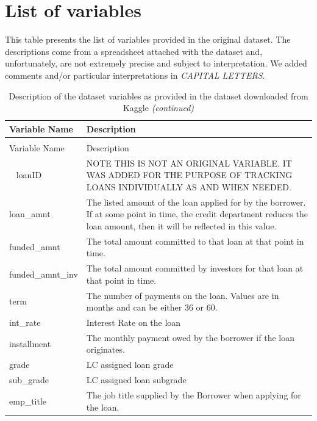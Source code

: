 \documentclass[11pt,]{report}
\begin{document}
\hypertarget{list-of-variables}{%
\section{List of variables}\label{list-of-variables}}

This table presents the list of variables provided in the original dataset. The descriptions come from a spreadsheet attached with the dataset and, unfortunately, are not extremely precise and subject to interpretation. We added comments and/or particular interpretations in \emph{CAPITAL LETTERS}.

\begin{longtable}[t]{>{\raggedright\arraybackslash}p{7cm}>{\raggedright\arraybackslash}p{7cm}}
\caption{\label{tab:variable-description}Description of the dataset variables as provided in the dataset downloaded from Kaggle}\\
\toprule
Variable Name & Description\\
\midrule
\endfirsthead
\caption[]{\label{tab:variable-description}Description of the dataset variables as provided in the dataset downloaded from Kaggle \textit{(continued)}}\\
\toprule
Variable Name & Description\\
\midrule
\endhead
\
\endfoot
\bottomrule
\endlastfoot
loanID & NOTE THIS IS NOT AN ORIGINAL VARIABLE. IT WAS ADDED FOR THE PURPOSE OF TRACKING LOANS INDIVIDUALLY AS AND WHEN NEEDED.\\
loan\_amnt & The listed amount of the loan applied for by the borrower. If at some point in time, the credit department reduces the loan amount, then it will be reflected in this value.\\
funded\_amnt & The total amount committed to that loan at that point in time.\\
funded\_amnt\_inv & The total amount committed by investors for that loan at that point in time.\\
term & The number of payments on the loan. Values are in months and can be either 36 or 60.\\
\addlinespace
int\_rate & Interest Rate on the loan\\
installment & The monthly payment owed by the borrower if the loan originates.\\
grade & LC assigned loan grade\\
sub\_grade & LC assigned loan subgrade\\
emp\_title & The job title supplied by the Borrower when applying for the loan.\\

\end{longtable}
\end{document}
